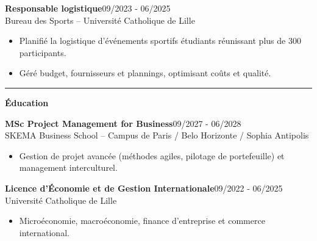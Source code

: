 \documentclass[a4paper]{article}
\renewcommand{\colorbox}[2]{#2}%
\newcommand{\fullrule}{\hspace{-1.5cm}\rule{\paperwidth}{0.4pt}}
\newcommand{\cvsection}[1]{%
  \vspace{6pt}\textbf{\Large #1}\par\vspace{2pt}}
\begin{document}
\vspace{3mm}

\colorbox{maincolor}{%
  \begin{minipage}{\linewidth}
    \noindent
    \textbf{Responsable logistique}\hfill 09/2023 - 06/2025\\
    Bureau des Sports – Université Catholique de Lille\\[-0.3em]
    \begin{itemize}[leftmargin=*]
      \item Planifié la logistique d’événements sportifs étudiants réunissant plus de 300 participants. \item Géré budget, fournisseurs et plannings, optimisant coûts et qualité.
    \end{itemize}
  \end{minipage}}

\medskip\fullrule

\cvsection{Éducation}
\vspace{0.3cm}

\colorbox{maincolor}{%
  \begin{minipage}{\linewidth}
    \noindent
    \textbf{MSc Project Management for Business}\hfill 09/2027 - 06/2028\\
    SKEMA Business School – Campus de Paris / Belo Horizonte / Sophia Antipolis\\[-0.3em]
    \begin{itemize}[leftmargin=*]
      \item Gestion de projet avancée (méthodes agiles, pilotage de portefeuille) et management interculturel.
    \end{itemize}
  \end{minipage}}

\vspace{3mm}

\colorbox{maincolor}{%
  \begin{minipage}{\linewidth}
    \noindent
    \textbf{Licence d’Économie et de Gestion Internationale}\hfill 09/2022 - 06/2025\\
    Université Catholique de Lille\\[-0.3em]
    \begin{itemize}[leftmargin=*]
      \item Microéconomie, macroéconomie, finance d’entreprise et commerce international.
    \end{itemize}
  \end{minipage}}
\end{document}
